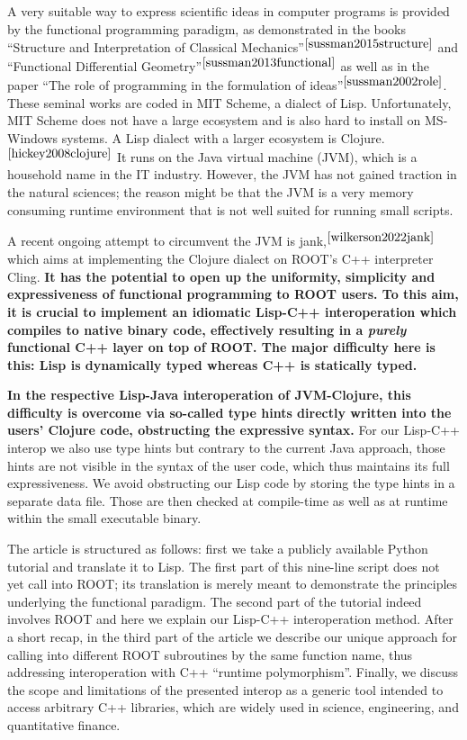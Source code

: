 \documentclass[twocolumn]{article}
\begin{document}
A very suitable way to express scientific ideas in computer programs is provided by the functional programming paradigm, as demonstrated in the books “Structure and Interpretation of Classical Mechanics”$^{\cite{sussman2015structure}}$ and “Functional Differential Geometry”$^{\cite{sussman2013functional}}$ as well as in the paper “The role of programming in the formulation of ideas”$^{\cite{sussman2002role}}$. These seminal works are coded in MIT Scheme, a dialect of Lisp. Unfortunately, MIT Scheme does not have a large ecosystem and is also hard to install on MS-Windows systems. A Lisp dialect with a larger ecosystem is Clojure.$^{\cite{hickey2008clojure}}$ It runs on the Java virtual machine (JVM), which is a household name in the IT industry. However, the JVM has not gained traction in the natural sciences; the reason might be that the JVM is a very memory consuming runtime environment that is not well suited for running small scripts.

A recent ongoing attempt to circumvent the JVM is jank,$^{\cite{wilkerson2022jank}}$ which aims at implementing the Clojure dialect on ROOT’s C++ interpreter Cling. \textbf{It has the potential to open up the uniformity, simplicity and expressiveness of functional programming to ROOT users. To this aim, it is crucial to implement an idiomatic Lisp-C++ interoperation which compiles to native binary code, effectively resulting in a \textit{purely} functional C++ layer on top of ROOT. The major difficulty here is this: Lisp is dynamically typed whereas C++ is statically typed.}

\textbf{In the respective Lisp-Java interoperation of JVM-Clojure, this difficulty is overcome via so-called type hints directly written into the users’ Clojure code, obstructing the expressive syntax.} For our Lisp-C++ interop we also use type hints but contrary to the current Java approach, those hints are not visible in the syntax of the user code, which thus maintains its full expressiveness. We avoid obstructing our Lisp code by storing the type hints in a separate data file. Those are then checked at compile-time as well as at runtime within the small executable binary.

The article is structured as follows: first we take a publicly available Python tutorial and translate it to Lisp. The first part of this nine-line script does not yet call into ROOT; its translation is merely meant to demonstrate the principles underlying the functional paradigm. The second part of the tutorial indeed involves ROOT and here we explain our Lisp-C++ interoperation method. After a short recap, in the third part of the article we describe our unique approach for calling into different ROOT subroutines by the same function name, thus addressing interoperation with C++ “runtime polymorphism”. Finally, we discuss the scope and limitations of the presented interop as a generic tool intended to access arbitrary C++ libraries, which are widely used in science, engineering, and quantitative finance.
\end{document}
